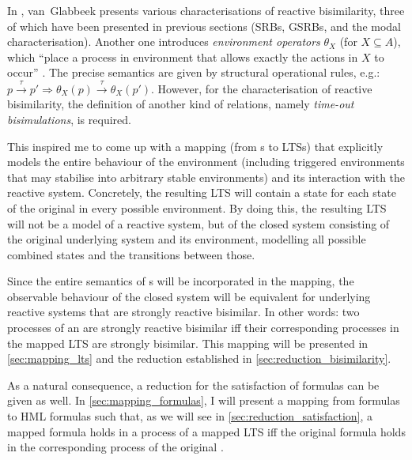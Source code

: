 %
\begin{isabellebody}%
%
%
\isadelimtheory
%
\endisadelimtheory
%
\isatagtheory
%
\endisatagtheory
{\isafoldtheory}%
%
\isadelimtheory
%
\endisadelimtheory
%
\isadelimdocument
%
\endisadelimdocument
%
\isatagdocument
%
\isamarkuptrue%
%
\endisatagdocument
{\isafolddocument}%
%
\isadelimdocument
%
\endisadelimdocument
%
\begin{isamarkuptext}%
\label{chap:reductions}%
\end{isamarkuptext}\isamarkuptrue%
%
\begin{isamarkuptext}%
In \cite{rbs}, van~Glabbeek presents various characterisations of reactive bisimilarity, three of which have been presented in previous sections (SRBs, GSRBs, and the modal characterisation). Another one introduces \emph{environment operators} $\theta_X$ (for $X \subseteq A$), which \enquote{place a process in  environment that allows exactly the actions in $X$ to occur} \cite[section 4]{rbs}. The precise semantics are given by structural operational rules, e.g.: $p \xrightarrow{\tau} p' \Longrightarrow \theta_X(p) \xrightarrow{\tau} \theta_X(p')$. However, for the characterisation of reactive bisimilarity, the definition of another kind of relations, namely \emph{time-out bisimulations}, is required. 

This inspired me to come up with a mapping (from \LTSt{}s to LTSs) that explicitly models the entire behaviour of the environment (including triggered environments that may stabilise into arbitrary stable environments) and its interaction with the reactive system. Concretely, the resulting LTS will contain a state for each state of the original \LTSt{} in every possible environment. By doing this, the resulting LTS will not be a model of a reactive system, but of the closed system consisting of the original underlying system and its environment, modelling all possible combined states and the transitions between those.

Since the entire semantics of \LTSt{}s will be incorporated in the mapping, the observable behaviour of the closed system will be equivalent for underlying reactive systems that are strongly reactive bisimilar. In other words: two processes of an \LTSt{} are strongly reactive bisimilar iff their corresponding processes in the mapped LTS are strongly bisimilar. This mapping will be presented in \cref{sec:mapping_lts} and the reduction established in \cref{sec:reduction_bisimilarity}.

As a natural consequence, a reduction for the satisfaction of \HMLt{} formulas can be given as well.
In \cref{sec:mapping_formulas}, I will present a mapping from \HMLt{} formulas to HML formulas such that, as we will see in \cref{sec:reduction_satisfaction}, a mapped formula holds in a process of a mapped LTS iff the original formula holds in the corresponding process of the original \LTSt{}.%
\end{isamarkuptext}\isamarkuptrue%
%
\isadelimtheory
%
\endisadelimtheory
%
\isatagtheory
%
\endisatagtheory
{\isafoldtheory}%
%
\isadelimtheory
%
\endisadelimtheory
%
\end{isabellebody}%
\endinput
